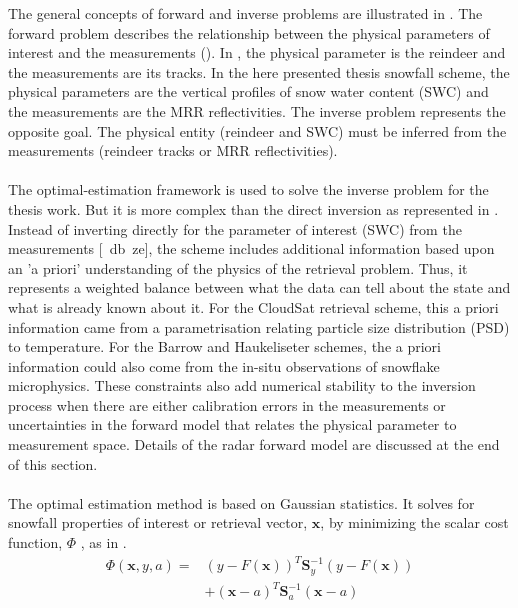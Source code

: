 The general concepts of forward and inverse problems are illustrated in .  The forward problem describes the relationship between the physical parameters of interest and the measurements (). In , the physical parameter is the reindeer and the measurements are its tracks. In the here presented thesis snowfall scheme, the physical parameters are the vertical profiles of snow water content (SWC) and the measurements are the MRR reflectivities.  The inverse problem represents the opposite goal.  The physical entity (reindeer and SWC) must be inferred from the measurements (reindeer tracks or MRR reflectivities).
\\
\\
The optimal-estimation framework is used to solve the inverse problem for the thesis work. But it is more complex than the direct inversion as represented in . Instead of inverting directly for the parameter of interest (SWC) from the measurements [\SI{}{\decibel ze}], the scheme includes additional information based upon an 'a priori' understanding of the physics of the retrieval problem. Thus, it represents a weighted balance between what the data can tell about the state and what is already known about it. For the CloudSat retrieval scheme, this a priori information came from a parametrisation relating particle size distribution (PSD) to temperature. For the Barrow and Haukeliseter schemes, the a priori information could also come from the in-situ observations of snowflake microphysics. These constraints also add numerical stability to the inversion process when there are either calibration errors in the measurements or uncertainties in the forward model that relates the physical parameter to measurement space. Details of the radar forward model are discussed at the end of this section.
\\
\\
The optimal estimation method is based on Gaussian statistics.  It solves for snowfall properties of interest or retrieval vector, $\mathbf{x}$, by minimizing the scalar cost function, $\Phi$ , as in .
\begin{equation}
\begin{split}
\Phi(\mathbf{x},y,a) = & (y- F(\mathbf{x}))^T \mathbf{S}_y^{-1} 			(y-F(\mathbf{x})) \\
&+(\mathbf{x}-a)^T \mathbf{S}_{a}^{-1} (\mathbf{x}-a)
\end{split} \label{eq:scalar_cost_fct}
\end{equation}
